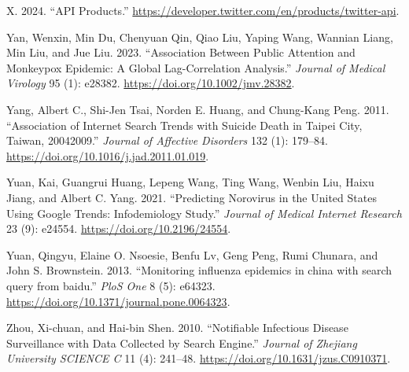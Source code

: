 \documentclass[
  12pt,
]{article}
\newlength{\cslhangindent}
\newenvironment{CSLReferences}[2] %
 {\begin{list}{}{%
  \setlength{\itemindent}{0pt}
  \setlength{\leftmargin}{0pt}
  \setlength{\parsep}{0pt}
  \ifodd #1
   \setlength{\leftmargin}{\cslhangindent}
   \setlength{\itemindent}{-1\cslhangindent}
  \fi
  \setlength{\itemsep}{#2\baselineskip}}}
 {\end{list}}
\begin{document}
\begin{CSLReferences}{1}{0}
X. 2024. {``API \textbar{} Products.''}
\url{https://developer.twitter.com/en/products/twitter-api}.

Yan, Wenxin, Min Du, Chenyuan Qin, Qiao Liu, Yaping Wang, Wannian Liang,
Min Liu, and Jue Liu. 2023. {``Association Between Public Attention and
Monkeypox Epidemic: A Global Lag{-}Correlation Analysis.''}
\emph{Journal of Medical Virology} 95 (1): e28382.
\url{https://doi.org/10.1002/jmv.28382}.

Yang, Albert C., Shi-Jen Tsai, Norden E. Huang, and Chung-Kang Peng.
2011. {``Association of Internet Search Trends with Suicide Death in
Taipei City, Taiwan, 2004{\textendash}2009.''} \emph{Journal of
Affective Disorders} 132 (1): 179--84.
\url{https://doi.org/10.1016/j.jad.2011.01.019}.

Yuan, Kai, Guangrui Huang, Lepeng Wang, Ting Wang, Wenbin Liu, Haixu
Jiang, and Albert C. Yang. 2021. {``Predicting Norovirus in the United
States Using Google Trends: Infodemiology Study.''} \emph{Journal of
Medical Internet Research} 23 (9): e24554.
\url{https://doi.org/10.2196/24554}.

Yuan, Qingyu, Elaine O. Nsoesie, Benfu Lv, Geng Peng, Rumi Chunara, and
John S. Brownstein. 2013. {``Monitoring influenza epidemics in china
with search query from baidu.''} \emph{PloS One} 8 (5): e64323.
\url{https://doi.org/10.1371/journal.pone.0064323}.

Zhou, Xi-chuan, and Hai-bin Shen. 2010. {``Notifiable Infectious Disease
Surveillance with Data Collected by Search Engine.''} \emph{Journal of
Zhejiang University SCIENCE C} 11 (4): 241--48.
\url{https://doi.org/10.1631/jzus.C0910371}.

\end{CSLReferences}
\end{document}
